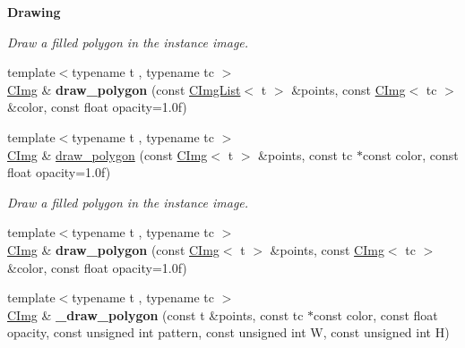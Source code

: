 \begin{Indent}{\bf Drawing}
\begin{DoxyCompactItemize}
\begin{DoxyCompactList}\small\item\em Draw a filled polygon in the instance image. \end{DoxyCompactList}\item 
\hypertarget{structcimg__library_1_1_c_img_a69b5366c244b08a6acd9790e3b7f0149}{{\footnotesize template$<$typename t , typename tc $>$ }\\\hyperlink{structcimg__library_1_1_c_img}{C\-Img} \& {\bfseries draw\-\_\-polygon} (const \hyperlink{structcimg__library_1_1_c_img_list}{C\-Img\-List}$<$ t $>$ \&points, const \hyperlink{structcimg__library_1_1_c_img}{C\-Img}$<$ tc $>$ \&color, const float opacity=1.\-0f)}\label{structcimg__library_1_1_c_img_a69b5366c244b08a6acd9790e3b7f0149}

\item 
\hypertarget{structcimg__library_1_1_c_img_a041d213b4cef656f9f58650e6739375a}{{\footnotesize template$<$typename t , typename tc $>$ }\\\hyperlink{structcimg__library_1_1_c_img}{C\-Img} \& \hyperlink{structcimg__library_1_1_c_img_a041d213b4cef656f9f58650e6739375a}{draw\-\_\-polygon} (const \hyperlink{structcimg__library_1_1_c_img}{C\-Img}$<$ t $>$ \&points, const tc $\ast$const color, const float opacity=1.\-0f)}\label{structcimg__library_1_1_c_img_a041d213b4cef656f9f58650e6739375a}

\begin{DoxyCompactList}\small\item\em Draw a filled polygon in the instance image. \end{DoxyCompactList}\item 
\hypertarget{structcimg__library_1_1_c_img_a75f8a5b92a966149ef3a78a2bf41604b}{{\footnotesize template$<$typename t , typename tc $>$ }\\\hyperlink{structcimg__library_1_1_c_img}{C\-Img} \& {\bfseries draw\-\_\-polygon} (const \hyperlink{structcimg__library_1_1_c_img}{C\-Img}$<$ t $>$ \&points, const \hyperlink{structcimg__library_1_1_c_img}{C\-Img}$<$ tc $>$ \&color, const float opacity=1.\-0f)}\label{structcimg__library_1_1_c_img_a75f8a5b92a966149ef3a78a2bf41604b}

\item 
\hypertarget{structcimg__library_1_1_c_img_ac88caf7a2e28ed8f290a123f0bc7763a}{{\footnotesize template$<$typename t , typename tc $>$ }\\\hyperlink{structcimg__library_1_1_c_img}{C\-Img} \& {\bfseries \-\_\-draw\-\_\-polygon} (const t \&points, const tc $\ast$const color, const float opacity, const unsigned int pattern, const unsigned int W, const unsigned int H)}\label{structcimg__library_1_1_c_img_ac88caf7a2e28ed8f290a123f0bc7763a}


\end{DoxyCompactItemize}
\end{Indent}
